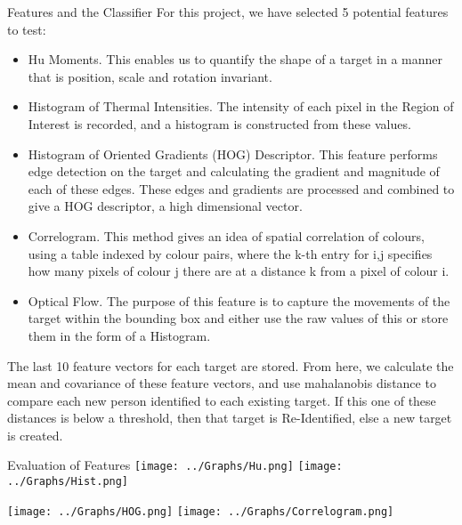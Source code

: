 \documentclass[final]{beamer}
\begin{document}
\begin{frame}{}
\begin{columns}[t]
\begin{column}{.49\linewidth}
        \begin{block}{Features and the Classifier}
        For this project, we have selected 5 potential features to test:
          \begin{itemize}
          \item Hu Moments. 
          This enables us to quantify the shape of a target in a manner that is position, scale and rotation invariant.
          \item Histogram of Thermal Intensities. 
          The intensity of each pixel in the Region of Interest is recorded, and a histogram is constructed from these values.
          \item Histogram of Oriented Gradients (HOG) Descriptor. 
          This feature performs edge detection on the target and calculating the gradient and magnitude of each of these edges. These edges and gradients are processed and combined to give a HOG descriptor, a high dimensional vector. 
          \item Correlogram. 
           This method gives an idea of spatial correlation of colours, using a table indexed by colour pairs, where the k-th entry for i,j specifies how many pixels of colour j there are at a distance k from a pixel of colour i.
          \item Optical Flow. 
          The purpose of this feature is to capture the movements of the target within the bounding box and either use the raw values of this or store them in the form of a Histogram.
          \end{itemize}
          The last 10 feature vectors for each target are stored. From here, we calculate the mean and covariance of these feature vectors, and use mahalanobis distance to compare each new person identified to each existing target. If this one of these distances is below a threshold, then that target is Re-Identified, else a new target is created.
        \end{block}
	
        \begin{block}{Evaluation of Features}
        \hspace{1cm}
		\texttt{[image: ../Graphs/Hu.png]}
		\hspace{2cm}
		\texttt{[image: ../Graphs/Hist.png]}
		
		\hspace{1cm}
		\texttt{[image: ../Graphs/HOG.png]}
		\hspace{2cm}
		\texttt{[image: ../Graphs/Correlogram.png]}
		

\end{block}
\end{column}
\end{columns}
\end{frame}
\end{document}
